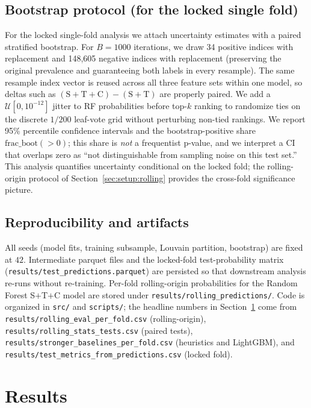 \documentclass[conference]{IEEEtran}
\newcommand{\code}[1]{\texttt{#1}}
\begin{document}
\subsection{Bootstrap protocol (for the locked single fold)}
\label{sec:setup:bootstrap}
For the locked single-fold analysis we attach uncertainty estimates
with a paired stratified bootstrap. For $B = 1000$ iterations, we
draw 34 positive indices with replacement and 148{,}605 negative
indices with replacement (preserving the original prevalence and
guaranteeing both labels in every resample). The same resample index
vector is reused across all three feature sets within one model, so
deltas such as
$(\mathrm{S}{+}\mathrm{T}{+}\mathrm{C}) - (\mathrm{S}{+}\mathrm{T})$
are properly paired. We add a $\mathcal{U}[0, 10^{-12}]$ jitter to RF
probabilities before top-$k$ ranking to randomize ties on the
discrete $1/200$ leaf-vote grid without perturbing non-tied rankings.
We report 95\% percentile confidence intervals and the
bootstrap-positive share $\mathrm{frac\_boot}(>0)$; this share is
\emph{not} a frequentist p-value, and we interpret a CI that overlaps
zero as ``not distinguishable from sampling noise on this test set.''
This analysis quantifies uncertainty conditional on the locked fold;
the rolling-origin protocol of Section~\ref{sec:setup:rolling}
provides the cross-fold significance picture.

\subsection{Reproducibility and artifacts}
All seeds (model fits, training subsample, Louvain partition,
bootstrap) are fixed at $42$. Intermediate parquet files and the
locked-fold test-probability matrix
(\code{results/test\_predictions.parquet}) are persisted so that
downstream analysis re-runs without re-training. Per-fold rolling-origin
probabilities for the Random Forest S$+$T$+$C model are stored under
\code{results/rolling\_predictions/}. Code is organized in
\code{src/} and \code{scripts/}; the headline numbers in
Section~\ref{sec:results} come from
\code{results/rolling\_eval\_per\_fold.csv} (rolling-origin),
\code{results/rolling\_stats\_tests.csv} (paired tests),
\code{results/stronger\_baselines\_per\_fold.csv} (heuristics and
LightGBM), and
\code{results/test\_metrics\_from\_predictions.csv} (locked fold).

\section{Results}\label{sec:results}
\end{document}
